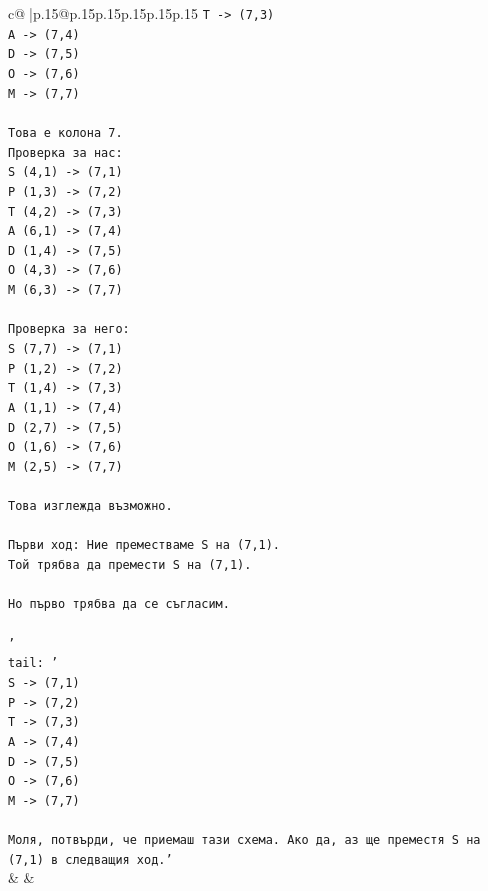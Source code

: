 \documentclass{article}
\begin{document}
{\begin{supertabular}{c@{$\;$}|p{.15\linewidth}@{}p{.15\linewidth}p{.15\linewidth}p{.15\linewidth}p{.15\linewidth}p{.15\linewidth}}
{{{\texttt{T {-}> (7,3)} \\
\texttt{A {-}> (7,4)} \\
\texttt{D {-}> (7,5)} \\
\texttt{O {-}> (7,6)} \\
\texttt{M {-}> (7,7)} \\
\\ 
\texttt{Това е колона 7.} \\
\texttt{Проверка за нас:} \\
\texttt{S (4,1) {-}> (7,1)} \\
\texttt{P (1,3) {-}> (7,2)} \\
\texttt{T (4,2) {-}> (7,3)} \\
\texttt{A (6,1) {-}> (7,4)} \\
\texttt{D (1,4) {-}> (7,5)} \\
\texttt{O (4,3) {-}> (7,6)} \\
\texttt{M (6,3) {-}> (7,7)} \\
\\ 
\texttt{Проверка за него:} \\
\texttt{S (7,7) {-}> (7,1)} \\
\texttt{P (1,2) {-}> (7,2)} \\
\texttt{T (1,4) {-}> (7,3)} \\
\texttt{A (1,1) {-}> (7,4)} \\
\texttt{D (2,7) {-}> (7,5)} \\
\texttt{O (1,6) {-}> (7,6)} \\
\texttt{M (2,5) {-}> (7,7)} \\
\\ 
\texttt{Това изглежда възможно.} \\
\\ 
\texttt{Първи ход: Ние преместваме S на (7,1).} \\
\texttt{Той трябва да премести S на (7,1).} \\
\\ 
\texttt{Но първо трябва да се съгласим.} \\
\\ 
\texttt{'} \\
\texttt{tail: '} \\
\texttt{S {-}> (7,1)} \\
\texttt{P {-}> (7,2)} \\
\texttt{T {-}> (7,3)} \\
\texttt{A {-}> (7,4)} \\
\texttt{D {-}> (7,5)} \\
\texttt{O {-}> (7,6)} \\
\texttt{M {-}> (7,7)} \\
\\ 
\texttt{Моля, потвърди, че приемаш тази схема. Ако да, аз ще преместя S на (7,1) в следващия ход.'} \\
            }
        }
    }
    & & \\ \\


\end{supertabular}}
\end{document}
